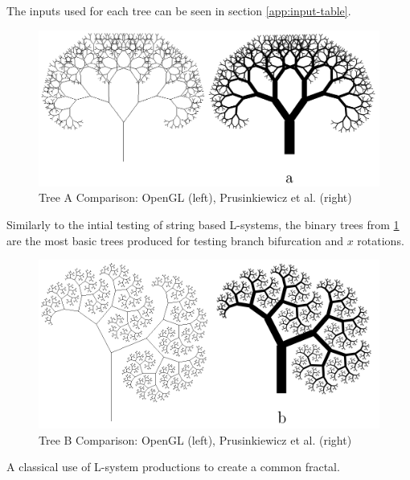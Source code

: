 \documentclass[final]{cmpreport}
\begin{document}
The inputs used for each tree can be seen in section \ref{app:input-table}.

\begin{figure}[ht]
    \includegraphics[scale=0.4]{tree-comp-a.png} 
    \centering
    \captionsetup{justification=centering}
    \caption{Tree A Comparison: OpenGL (left), Prusinkiewicz et al. (right)}
    \label{fig:tree-comp-a}
\end{figure}

Similarly to the intial testing of string based L-systems, the binary trees from \ref{fig:tree-comp-a}  
are the most basic trees produced for testing branch bifurcation and $x$ rotations.

\begin{figure}[ht]
    \includegraphics[scale=0.4]{tree-comp-b.png} 
    \centering
    \captionsetup{justification=centering}
    \caption{Tree B Comparison: OpenGL (left), Prusinkiewicz et al. (right)}
    \label{fig:tree-comp-b}
\end{figure}

A classical use of L-system productions to create a common fractal. 
\end{document}
